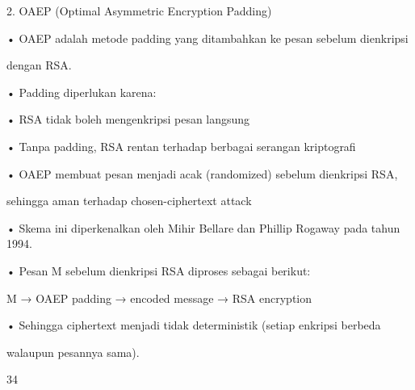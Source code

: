 \documentclass{article}
\begin{document}

2. OAEP (Optimal Asymmetric Encryption Padding)

• OAEP adalah metode padding yang ditambahkan ke pesan sebelum dienkripsi 

dengan RSA.

• Padding diperlukan karena:

• RSA tidak boleh mengenkripsi pesan langsung

• Tanpa padding, RSA rentan terhadap berbagai serangan kriptografi

• OAEP membuat pesan menjadi acak (randomized) sebelum dienkripsi RSA, 

sehingga aman terhadap chosen-ciphertext attack

• Skema ini diperkenalkan oleh Mihir Bellare dan Phillip Rogaway pada tahun 1994.

• Pesan M sebelum dienkripsi RSA diproses sebagai berikut:

       M → OAEP padding → encoded message → RSA encryption

• Sehingga ciphertext menjadi tidak deterministik (setiap enkripsi berbeda 

walaupun pesannya sama).

34
\end{document}

